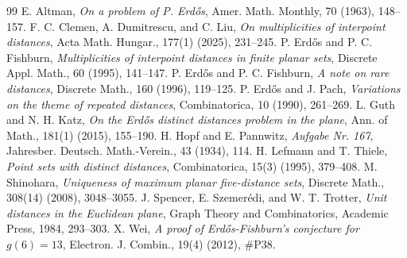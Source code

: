 \documentclass[11pt,reqno]{article}
\theoremstyle{definition}
\begin{document}
\begin{thebibliography}{99}
 E. Altman, \emph{On a problem of P. Erd\H{o}s}, Amer. Math. Monthly, 70 (1963), 148--157.
 F. C. Clemen, A. Dumitrescu, and C. Liu, \emph{On multiplicities of interpoint distances}, Acta Math. Hungar., 177(1) (2025), 231--245.
 P. Erd\H{o}s and P. C. Fishburn, \emph{Multiplicities of interpoint distances in finite planar sets}, Discrete Appl. Math., 60 (1995), 141--147.
 P. Erd\H{o}s and P. C. Fishburn, \emph{A note on rare distances}, Discrete Math., 160 (1996), 119--125.
 P. Erd\H{o}s and J. Pach, \emph{Variations on the theme of repeated distances}, Combinatorica, 10 (1990), 261--269.
 L. Guth and N. H. Katz, \emph{On the Erd\H{o}s distinct distances problem in the plane}, Ann. of Math., 181(1) (2015), 155--190.
 H. Hopf and E. Pannwitz, \emph{Aufgabe Nr. 167}, Jahresber. Deutsch. Math.-Verein., 43 (1934), 114.
 H. Lefmann and T. Thiele, \emph{Point sets with distinct distances}, Combinatorica, 15(3) (1995), 379--408.
 M. Shinohara, \emph{Uniqueness of maximum planar five-distance sets}, Discrete Math., 308(14) (2008), 3048--3055.
 J. Spencer, E. Szemer\'edi, and W. T. Trotter, \emph{Unit distances in the Euclidean plane}, Graph Theory and Combinatorics, Academic Press, 1984, 293--303.
 X. Wei, \emph{A proof of Erd\H{o}s-Fishburn's conjecture for $g(6)=13$}, Electron. J. Combin., 19(4) (2012), \#P38.
\end{thebibliography}
\end{document}
